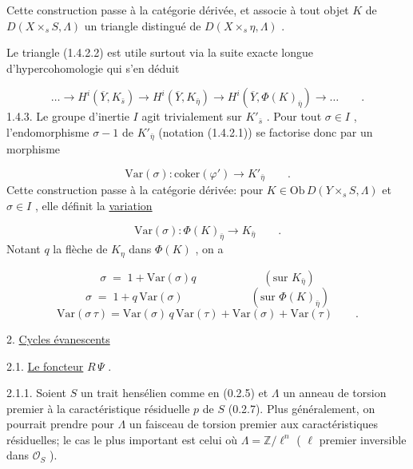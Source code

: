 
Cette construction passe à la catégorie dérivée, et associe à tout objet $K$ de $D(X \times_s S, \Lambda)$ un triangle distingué de $D(X \times_s \eta, \Lambda)$ .

Le triangle (1.4.2.2) est utile surtout via la suite exacte longue d'hypercohomologie qui s'en déduit

\begin{equation*}
\dots \longrightarrow H^i(\overline{Y}, K_{\bar{s}}) \longrightarrow H^i(\overline{Y}, K_{\bar{\eta}}) \longrightarrow H^i(\overline{Y}, \Phi(K)_{\bar{\eta}}) \longrightarrow \dots \qquad .
\end{equation*}
1.4.3. Le groupe d'inertie $I$ agit trivialement sur $K'_{\bar{s}}$ . Pour tout $\sigma \in I$ , l'endomorphisme $\sigma - 1$ de $K'_{\bar{\eta}}$ (notation (1.4.2.1)) se factorise donc par un morphisme

\begin{equation*}
\mathrm{Var}(\sigma) : \mathrm{coker}(\varphi') \longrightarrow K'_{\bar{\eta}} \qquad .
\end{equation*}
Cette construction passe à la catégorie dérivée: pour $K \in \mathrm{Ob}\, D(Y \times_s S, \Lambda)$ et $\sigma \in I$ , elle définit la \underline{variation}

\begin{equation}\tag{1.4.3.1}
\mathrm{Var}(\sigma) : \Phi(K)_{\bar{\eta}} \longrightarrow K_{\bar{\eta}} \qquad .
\end{equation}
Notant $q$ la flèche de $K_{\eta}$ dans $\Phi(K)$ , on a

\begin{equation}\tag{1.4.3.2}
\sigma \;=\; 1 + \mathrm{Var}(\sigma)q \qquad\qquad\qquad (\text{sur } K_{\bar{\eta}} )
\end{equation}
\begin{equation}\tag{1.4.3.3}
\sigma \;=\; 1 + q\, \mathrm{Var}(\sigma) \qquad\qquad\qquad (\text{sur } \Phi(K)_{\bar{\eta}} )
\end{equation}
\begin{equation}\tag{1.4.3.4}
\mathrm{Var}(\sigma\, \tau) = \mathrm{Var}(\sigma)\, q\, \mathrm{Var}(\tau) + \mathrm{Var}(\sigma) + \mathrm{Var}(\tau) \qquad .
\end{equation}

2. \underline{Cycles évanescents}


2.1. \underline{Le foncteur} $R\,\Psi$ .

2.1.1. Soient $S$ un trait hensélien comme en (0.2.5) et $\Lambda$ un anneau de torsion premier à la caractéristique résiduelle $p$ de $S$ (0.2.7). Plus généralement, on pourrait prendre pour $\Lambda$ un faisceau de torsion premier aux caractéristiques résiduelles; le cas le plus important est celui où $\Lambda = \mathbb{Z}/\ell^{n}$ ( $\ell$ premier inversible dans $\mathcal{O}_{S}$ ).


